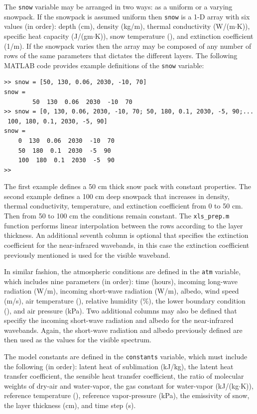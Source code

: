 The \texttt{snow} variable may be arranged in two ways: as a uniform or a varying snowpack.  If the snowpack is assumed uniform then \texttt{snow} is a 1-D array with six values (in order): depth (cm), density (kg/m), thermal conductivity (W/(m$\cdot$K)), specific heat capacity (J/(gm$\cdot$K)), snow temperature (\C), and extinction coefficient (1/m).  If the snowpack varies then the array may be composed of any number of rows of the same parameters that dictates the different layers.  The following MATLAB code provides example definitions of the \texttt{snow} variable:
\begin{singlespaced}\begin{lstlisting}[style=inline]
>> snow = [50, 130, 0.06, 2030, -10, 70]
snow =
		50  130  0.06  2030  -10  70
>> snow = [0, 130, 0.06, 2030, -10, 70; 50, 180, 0.1, 2030, -5, 90;...
 100, 180, 0.1, 2030, -5, 90]
snow =
	0  130  0.06  2030  -10  70
	50  180  0.1  2030  -5  90
	100  180  0.1  2030  -5  90
>> 
\end{lstlisting}\end{singlespaced}

The first example defines a 50 cm thick snow pack with constant properties.  The second example defines a 100 cm deep snowpack that increases in density, thermal conductivity, temperature, and extinction coefficient from 0 to 50 cm.  Then from 50 to 100 cm the conditions remain constant.  The \texttt{xls\_prep.m} function performs linear interpolation between the rows according to the layer thickness.  An additional seventh column is optional that specifies the extinction coefficient for the near-infrared wavebands, in this case the extinction coefficient previously mentioned is used for the visible waveband.

In similar fashion, the atmospheric conditions are defined in the \texttt{atm} variable, which includes nine parameters (in order): time (hours), incoming long-wave radiation (W/m), incoming short-wave radiation (W/m), albedo, wind speed (m/s), air temperature (\C), relative humidity (\%), the lower boundary condition (\C), and air pressure (kPa).  Two additional columns may also be defined that specifiy the incoming short-wave radiation and albedo for the near-infrared wavebands.  Again, the short-wave radiation and albedo previously defined are then used as the values for the visible spectrum.

The model constants are defined in the \texttt{constants} variable, which must include the following (in order): latent heat of sublimation (kJ/kg), the latent heat transfer coefficient, the sensible heat transfer coefficient, the ratio of molecular weights of dry-air and water-vapor, the gas constant for water-vapor (kJ/(kg$\cdot$K)), reference temperature (\C), reference vapor-pressure (kPa), the emissivity of snow, the layer thickness (cm), and time step (s).

